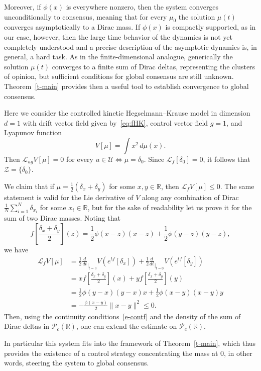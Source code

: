 \documentclass{article}
\newcommand{\R}{\mathbb{R}}
\newcommand{\Z}{\mathcal{Z}}
\renewcommand{\L}{\mathcal{L}}
\theoremstyle{definition}\newtheorem{remark}{Remark}
\begin{document}
Moreover, if $\phi(x)$ is everywhere nonzero, then the system converges unconditionally to consensus, meaning that for every $\mu_0$ the solution $\mu(t)$ converges asymptotically to a Dirac mass.  
If $\phi(x)$ is compactly supported, as in our case, however, then
the large time behavior of the dynamics  is not yet completely understood and a precise description of the asymptotic dynamics is, in general, a hard task. As in the finite-dimensional analogue, generically the solution $\mu(t)$ converges to a finite sum of Dirac deltas, representing the clusters of opinion, but sufficient conditions for global consensus are still unknown. 
Theorem~\ref{t-main} provides then a useful tool to establish convergence to global consensus. 

Here we consider the controlled kinetic Hegselmann--Krause model in dimension $d=1$ with drift vector field given by~\eqref{eq:fHK}, control vector field $g=1$, and Lyapunov function
$$
V[\mu] = \int x^2 \, d\mu(x).
$$
Then 
$\L_{ug} V[\mu] = 0$ for every 
$u \in \mathcal{U} \Leftrightarrow \mu = \delta_0.$ 
Since $\L_f [\delta_0]=0$, it follows that $\Z=\{\delta_0\}$. 

We claim that if $\mu  = \frac{1}{2}(\delta_x + \delta_y)$ for some $x,y \in \R$, then $\L_fV[\mu] \leq 0$.
The same statement is valid for the Lie derivative of $V$ along any combination of Dirac 
$\frac{1}{N}\sum_{i=1}^N \delta_{x_i}$ for some ${x_i} \in \R$, 
but for the sake of readability let us prove it for the sum of two Dirac masses.
Noting that 
$$
f\left[\frac{\delta_x+\delta_y}{2}\right](z) = \frac{1}{2} \phi(x-z) (x-z) +\frac{1}{2} \phi(y-z) (y-z),
$$
we have
\begin{align*}
\L_fV[\mu] &= \frac{1}{2} \frac{d}{dt}_{|_{t=0}} V(e^{tf}[\delta_x]) + \frac{1}{2} \frac{d}{dt}_{|_{t=0}} V(e^{tf}[\delta_y])\\
&= x  f\left[\frac{\delta_x+\delta_y}{2}\right](x) + y   f\left[\frac{\delta_x+\delta_y}{2}\right](y)\\
& = \frac{1}{2} \phi(y-x)(y-x)  x +\frac{1}{2} \phi(x-y)(x-y)   y\\
& = -\frac{\phi(x-y)}{2}\|x-y\|^2 \leq 0. 
\end{align*}
Then, using the continuity conditions~\eqref{e-contf} and the density of the sum of Dirac deltas in $\mathcal{P}_c(\R)$, one can extend the estimate on $\mathcal{P}_c(\R)$.

In particular this system fits into the framework of Theorem~\ref{t-main}, which thus provides the existence of a control strategy concentrating the mass at $0$, in other words, steering the system to global consensus.
\end{document}
